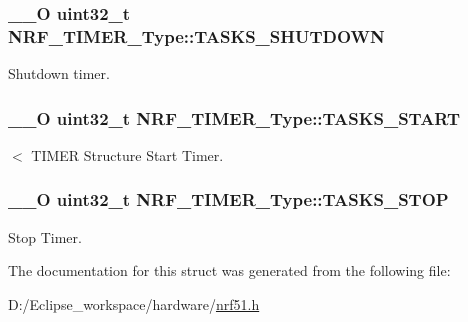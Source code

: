\subsubsection[{T\+A\+S\+K\+S\+\_\+\+S\+H\+U\+T\+D\+O\+W\+N}]{\setlength{\rightskip}{0pt plus 5cm}\+\_\+\+\_\+\+O uint32\+\_\+t N\+R\+F\+\_\+\+T\+I\+M\+E\+R\+\_\+\+Type\+::\+T\+A\+S\+K\+S\+\_\+\+S\+H\+U\+T\+D\+O\+W\+N}\label{struct_n_r_f___t_i_m_e_r___type_a506d472f5660cb9721f4ceccfc7ecbf2}
Shutdown timer. \hypertarget{struct_n_r_f___t_i_m_e_r___type_ad89116b4de09e7d921ddd956531165fb}{}
\subsubsection[{T\+A\+S\+K\+S\+\_\+\+S\+T\+A\+R\+T}]{\setlength{\rightskip}{0pt plus 5cm}\+\_\+\+\_\+\+O uint32\+\_\+t N\+R\+F\+\_\+\+T\+I\+M\+E\+R\+\_\+\+Type\+::\+T\+A\+S\+K\+S\+\_\+\+S\+T\+A\+R\+T}\label{struct_n_r_f___t_i_m_e_r___type_ad89116b4de09e7d921ddd956531165fb}
$<$ T\+I\+M\+E\+R Structure Start Timer. \hypertarget{struct_n_r_f___t_i_m_e_r___type_ab31e11c24380e62885a668e9972c778d}{}
\subsubsection[{T\+A\+S\+K\+S\+\_\+\+S\+T\+O\+P}]{\setlength{\rightskip}{0pt plus 5cm}\+\_\+\+\_\+\+O uint32\+\_\+t N\+R\+F\+\_\+\+T\+I\+M\+E\+R\+\_\+\+Type\+::\+T\+A\+S\+K\+S\+\_\+\+S\+T\+O\+P}\label{struct_n_r_f___t_i_m_e_r___type_ab31e11c24380e62885a668e9972c778d}
Stop Timer. 

The documentation for this struct was generated from the following file\+:\begin{DoxyCompactItemize}
\item 
D\+:/\+Eclipse\+\_\+workspace/hardware/\hyperlink{nrf51_8h}{nrf51.\+h}\end{DoxyCompactItemize}
